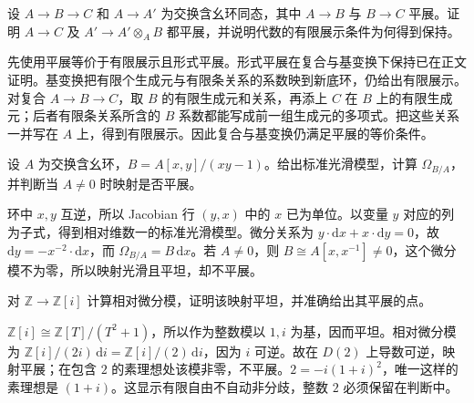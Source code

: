 \begin{optionalexercise}\label{b3:ex:23-etale-stability}
	设 \(A\rightarrow B\rightarrow C\) 和 \(A\rightarrow A'\) 为交换含幺环同态，其中 \(A\rightarrow B\) 与 \(B\rightarrow C\) 平展。证明 \(A\rightarrow C\) 及 \(A'\rightarrow A'\otimes_A B\) 都平展，并说明代数的有限展示条件为何得到保持。
\end{optionalexercise}
\begin{solution}
	先使用平展等价于有限展示且形式平展。形式平展在复合与基变换下保持已在正文证明。基变换把有限个生成元与有限条关系的系数映到新底环，仍给出有限展示。对复合 \(A\to B\to C\)，取 \(B\) 的有限生成元和关系，再添上 \(C\) 在 \(B\) 上的有限生成元；后者有限条关系所含的 \(B\) 系数都能写成前一组生成元的多项式。把这些关系一并写在 \(A\) 上，得到有限展示。因此复合与基变换仍满足平展的等价条件。
\end{solution}

\begin{optionalexercise}\label{b3:ex:23-hyperbola-standard-model}
	设 \(A\) 为交换含幺环，\(B=A[x,y]/(xy-1)\)。给出标准光滑模型，计算 \(\Omega_{B/A}\)，并判断当 \(A\ne0\) 时映射是否平展。
\end{optionalexercise}
\begin{solution}
	环中 \(x,y\) 互逆，所以 Jacobian 行 \((y,x)\) 中的 \(x\) 已为单位。以变量 \(y\) 对应的列为子式，得到相对维数一的标准光滑模型。微分关系为 \(y\cdot\mathrm{d}x+x\cdot\mathrm{d}y=0\)，故 \(\mathrm{d}y=-x^{-2}\cdot\mathrm{d}x\)，而 \(\Omega_{B/A}=B\,\mathrm{d}x\)。若 \(A\ne0\)，则 \(B\cong A[x,x^{-1}]\ne0\)，这个微分模不为零，所以映射光滑且平坦，却不平展。
\end{solution}

\begin{optionalexercise}\label{b3:ex:23-gaussian-integers-etale}
	对 \(\mathbb Z\to\mathbb Z[i]\) 计算相对微分模，证明该映射平坦，并准确给出其平展的点。
\end{optionalexercise}
\begin{solution}
	\(\mathbb Z[i]\cong\mathbb Z[T]/(T^2+1)\)，所以作为整数模以 \(1,i\) 为基，因而平坦。相对微分模为 \(\mathbb Z[i]/(2i)\,\mathrm{d}i=\mathbb Z[i]/(2)\,\mathrm{d}i\)，因为 \(i\) 可逆。故在 \(D(2)\) 上导数可逆，映射平展；在包含 \(2\) 的素理想处该模非零，不平展。\(2=-i(1+i)^2\)，唯一这样的素理想是 \((1+i)\)。这显示有限自由不自动非分歧，整数 \(2\) 必须保留在判断中。
\end{solution}

